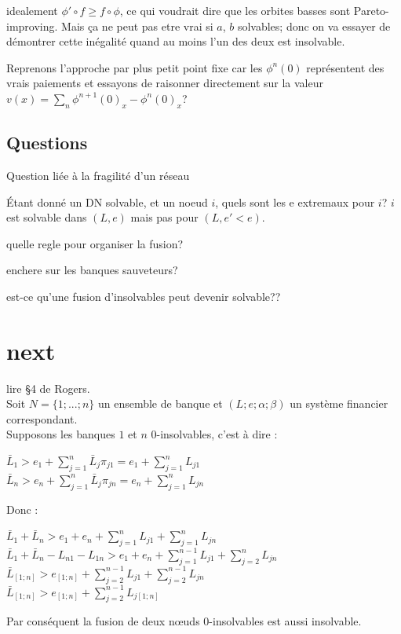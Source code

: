 \documentclass[11pt,oneside,twocolumn]{article}
\begin{document}

idealement $\phi'\circ f \geq f\circ\phi$, ce qui voudrait dire que
les orbites basses sont Pareto-improving. Mais ça ne peut pas etre vrai si $a$, $b$ solvables; donc on va essayer de démontrer cette inégalité quand au moins l'un des deux est insolvable.

Reprenons l'approche par plus petit point fixe car les $\phi^n(0)$
représentent des vrais paiements et essayons de raisonner directement
sur la valeur $v(x) = \sum_n \phi^{n+1}(0)_x-\phi^n(0)_x$?


\subsection{Questions}

Question liée à la fragilité d'un réseau

Étant donné un DN solvable, et un noeud $i$,
quels sont les e extremaux pour $i$?
$i$ est solvable dans $(L,e)$ mais pas
pour $(L,e'<e)$.

quelle regle pour organiser la fusion?

enchere sur les banques sauveteurs?

est-ce qu'une fusion d'insolvables
peut devenir solvable??

\section{next}

lire \S4 de Rogers.\\

Soit $N = \lbrace 1;...; n\rbrace$ un ensemble de banque et $(L; e; \alpha; \beta)$ un système financier correspondant.\\
Supposons les banques $1$ et $n$ $0$-insolvables, c'est à dire :
\begin{center}
$\bar{L}_{1} > e_{1} + \sum_{j=1}^{n} \bar{L}_{j} \pi_{j1} = e_{1} + \sum_{j=1}^{n} L_{j1}$\\
$\bar{L}_{n} > e_{n} + \sum_{j=1}^{n} \bar{L}_{j} \pi_{jn} = e_{n} + \sum_{j=1}^{n} L_{jn}$
\end{center}
Donc :
\begin{center}
 $\bar{L}_{1} + \bar{L}_{n} > e_{1} + e_{n} + \sum_{j=1}^{n} L_{j1} + \sum_{j=1}^{n} L_{jn}$\\
$\bar{L}_{1} + \bar{L}_{n} - L_{n1} - L_{1n} > e_{1} + e_{n} + \sum_{j=1}^{n-1} L_{j1} + \sum_{j=2}^{n} L_{jn}$\\
$\bar{L}_{\left[ 1;n\right]} > e_{\left[ 1;n\right]} + \sum_{j=2}^{n-1} L_{j1} + \sum_{j=2}^{n-1} L_{jn}$ \\
$\bar{L}_{\left[ 1;n\right]} > e_{\left[ 1;n\right]} + \sum_{j=2}^{n-1} L_{j\left[ 1;n\right]}$
\end{center}
Par conséquent la fusion de deux nœuds $0$-insolvables est aussi insolvable.
\end{document}
